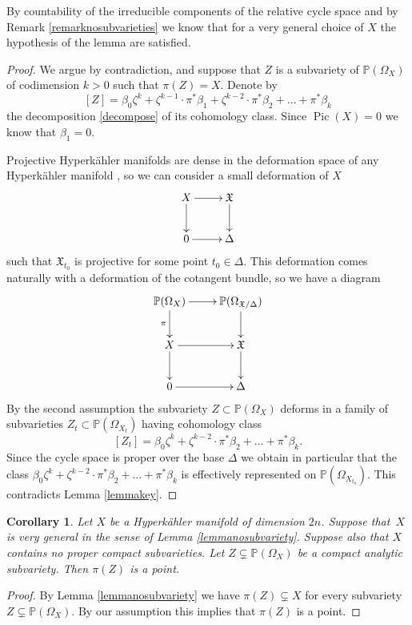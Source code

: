 \documentclass[11pt]{article}
\theoremstyle{plain}
\newtheorem{corollary}[theorem]{Corollary}
\theoremstyle{definition}
\newcommand{\PP}{\ensuremath{\mathbb{P}}}
\DeclareMathOperator{\pic}{Pic}
\begin{document}
By countability of the irreducible components of the relative cycle space \cite[Th.]{Fuj79} and by Remark \ref{remarknosubvarieties} we know that for a very general choice of $X$ the hypothesis of the lemma are satisfied.

\begin{proof}
We argue by contradiction, and suppose that $Z$ is a subvariety of $\PP(\Omega_X)$ of codimension $k>0$ such that $\pi(Z) = X$.
Denote by
\[
[Z]=\beta_0 \zeta^k + \zeta^{k-1}\cdot \pi^* \beta_1 + \zeta^{k-2}\cdot \pi^* \beta_2 + \ldots + \pi^* \beta_k
\]
the decomposition \eqref{decompose} of its cohomology class. Since $\pic (X)=0$ we know that
$\beta_1=0$.

Projective Hyperkähler manifolds are dense in the deformation space of any Hyperkähler manifold \cite[\S 9]{Bea83} \cite[Prop.\,5]{Buc08},
so we can consider a small deformation of $X$
\[ \xymatrix{
X\ar[r] \ar[d] & \mathfrak{X}\ar[d]\\
0 \ar[r]& \Delta
}\]
such that $\mathfrak X_{t_0}$ is projective for some point $t_0 \in \Delta$.
This deformation comes naturally with a deformation of the cotangent bundle, so we have a diagram
\[ \xymatrix{
\PP(\Omega_X) \ar[r]\ar[d]_{\pi} & \PP(\Omega_{\mathfrak{X}/\Delta})\ar[d]\\
X\ar[r] \ar[d] & \mathfrak{X}\ar[d]\\
0 \ar[r]& \Delta
}\]
By the second assumption the subvariety $Z\subset \PP(\Omega_X)$ deforms
in a family of subvarieties $Z_{t}\subset \PP(\Omega_{X_{t}})$
having cohomology class
\[
[Z_t]=\beta_0 \zeta^k + \zeta^{k-2}\cdot \pi^* \beta_2 + \ldots + \pi^* \beta_k.
\]
Since the cycle space is proper over the base $\Delta$ \cite[Th.\,1]{Ba75} we obtain in particular that the class
$\beta_0 \zeta^k + \zeta^{k-2}\cdot \pi^* \beta_2 + \ldots + \pi^* \beta_k$ is effectively represented
on $\PP(\Omega_{X_{t_0}})$. This contradicts Lemma \ref{lemmakey}.
\end{proof}

\begin{corollary}\label{corollarynosubvariety}
Let $X$ be a Hyperkähler manifold of dimension $2n$. Suppose that~$X$ is very general in the sense of Lemma \ref{lemmanosubvariety}.
Suppose also that
$X$ contains no proper compact subvarieties.
Let $Z \subsetneq \PP(\Omega_X)$ be a compact analytic subvariety.
Then $\pi(Z)$ is a point.
\end{corollary}

\begin{proof}
By Lemma \ref{lemmanosubvariety} we have $\pi(Z) \subsetneq X$
for every subvariety $Z \subsetneq \PP(\Omega_X)$.
By our assumption this implies that $\pi(Z)$ is a point.
\end{proof}
\end{document}
